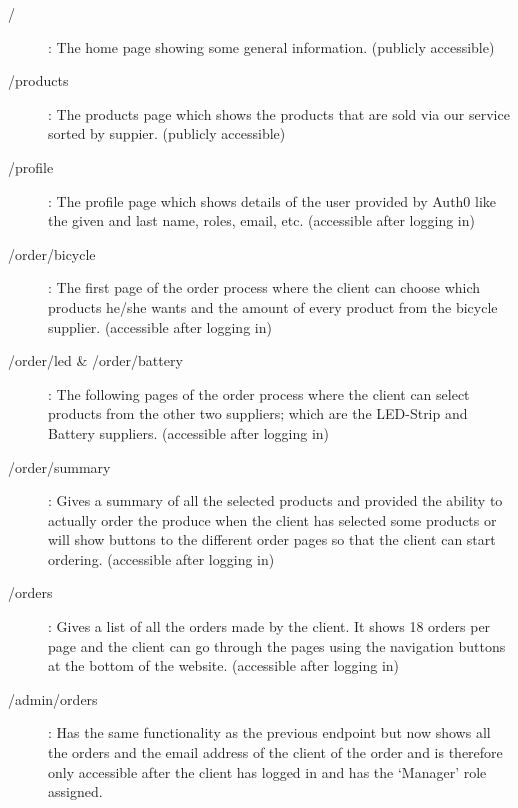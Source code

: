 \documentclass[10pt,a4paper,kul]{kulakarticle} %
\begin{document}
	\begin{description}
		\item[/]: The home page showing some general information. (publicly accessible)
		\item[/products]: The products page which shows the products that are sold via our service sorted by suppier. (publicly accessible)
		\item[/profile]: The profile page which shows details of the user provided by Auth0 like the given and last name, roles, email, etc. (accessible after logging in)
		\item[/order/bicycle]: The first page of the order process where the client can choose which products he/she wants and the amount of every product from the bicycle supplier. (accessible after logging in)
		\item[/order/led \& /order/battery]: The following pages of the order process where the client can select products from the other two suppliers; which are the LED-Strip and Battery suppliers. (accessible after logging in)
		\item[/order/summary]: Gives a summary of all the selected products and provided the ability to actually order the produce when the client has selected some products or will show buttons to the different order pages so that the client can start ordering. (accessible after logging in)
		\item[/orders]: Gives a list of all the orders made by the client. It shows 18 orders per page and the client can go through the pages using the navigation buttons at the bottom of the website. (accessible after logging in)
		\item[/admin/orders]: Has the same functionality as the previous endpoint but now shows all the orders and the email address of the client of the order and is therefore only accessible after the client has logged in and has the `Manager' role assigned.
	\end{description}
	
\end{document}
